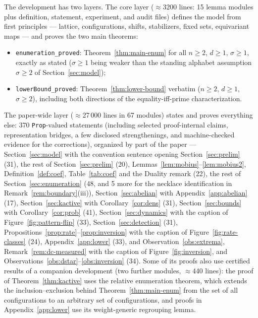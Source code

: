 \documentclass[11pt,a4paper]{article}
\theoremstyle{remark}
\begin{document}
The development has two layers. The core layer ($\approx$3200 lines: 15
lemma modules plus definition, statement, experiment, and audit files)
defines the model from first principles --- lattice, configurations,
shifts, stabilizers, fixed sets, equivariant maps --- and proves the two
main theorems:
\begin{itemize}
    \item \texttt{enumeration\_proved}: Theorem~\ref{thm:main-enum} for
    all $n\ge2$, $d\ge1$, $\sigma\ge1$, exactly as stated ($\sigma\ge1$
    being weaker than the standing alphabet assumption $\sigma\ge2$ of
    Section~\ref{sec:model});
    \item \texttt{lowerBound\_proved}: Theorem~\ref{thm:lower-bound}
    verbatim ($n\ge2$, $d\ge1$, $\sigma\ge2$), including both directions
    of the equality-iff-prime characterization.
\end{itemize}
The paper-wide layer ($\approx$27\,000 lines in 67 modules) states and
proves everything else: 370 \texttt{Prop}-valued statements (including
selected proof-internal claims, representation bridges, a
few disclosed strengthenings, and machine-checked evidence for the
corrections), organized by part of the paper ---
Section~\ref{sec:model} with the convention sentence opening
Section~\ref{sec:prelim} (31), the rest of
Section~\ref{sec:prelim} (20), Lemmas~\ref{lem:mobius}--\ref{lem:mobius2},
Definition~\ref{def:coef}, Table~\ref{tab:coef} and the Duality remark (22), the rest of
Section~\ref{sec:enumeration} (48, and 5 more for the necklace
identification in Remark~\ref{rem:boundary}(iii)), Section~\ref{sec:abelian} with Appendix~\ref{app:abelian} (17),
Section~\ref{sec:kactive} with
Corollary~\ref{cor:dens} (31), Section~\ref{sec:bounds} with
Corollary~\ref{cor:prob} (41), Section~\ref{sec:dynamics} with the
caption of Figure~\ref{fig:pattern-flip} (33),
Section~\ref{sec:detection} (31),
Propositions~\ref{prop:rate}--\ref{prop:inversion} with the caption of
Figure~\ref{fig:rate-classes} (24),
Appendix~\ref{app:lower} (33), and
Observation~\ref{obs:extrema}, Remark~\ref{rem:dc-measured} with the
caption of Figure~\ref{fig:inversion}, and
Observations~\ref{obs:dstar}--\ref{obs:inversion} (34). Some of its proofs
also use certified results of a companion development (two further
modules, $\approx$440 lines): the proof of Theorem~\ref{thm:kactive}
uses the relative enumeration theorem, which extends the
inclusion--exclusion behind Theorem~\ref{thm:main-enum} from the set of
all configurations to an arbitrary set of configurations, and proofs in
Appendix~\ref{app:lower} use its weight-generic regrouping lemma.
\end{document}
